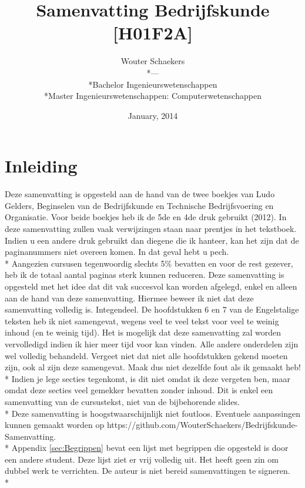 \documentclass[12pt]{article}
\title{Samenvatting Bedrijfskunde [H01F2A]}
\author{Wouter Schaekers\\*---\\*Bachelor Ingenieurswetenschappen\\*Master Ingenieurswetenschappen: Computerwetenschappen}
\date{January, 2014}
\begin{document}
\pagestyle{fancy}
\maketitle
\setcounter{page}{0}
\setcounter{section}{-1}
\renewcommand{\contentsname}{Inhoudstafel}
\setcounter{tocdepth}{3}
\tableofcontents
\clearpage
\section{Inleiding}
Deze samenvatting is opgesteld aan de hand van de twee boekjes van Ludo Gelders, Beginselen van de Bedrijfskunde en Technische Bedrijfsvoering en Organisatie. Voor beide boekjes heb ik de 5de en 4de druk gebruikt (2012). In deze samenvatting zullen vaak verwijzingen staan naar prentjes in het tekstboek. Indien u een andere druk gebruikt dan diegene die ik hanteer, kan het zijn dat de paginanummers niet overeen komen. In dat geval hebt u pech.\\*
Aangezien cursusen tegenwoordig slechts 5\% bevatten en voor de rest gezever, heb ik de totaal aantal paginas sterk kunnen reduceren. Deze samenvatting is opgesteld met het idee dat dit vak succesvol kan worden afgelegd, enkel en alleen aan de hand van deze samenvatting. Hiermee beweer ik niet dat deze samenvatting volledig is. Integendeel. De hoofdstukken 6 en 7 van de Engelstalige teksten heb ik niet samengevat, wegens veel te veel tekst voor veel te weinig inhoud (en te weinig tijd). Het is mogelijk dat deze samenvatting zal worden vervolledigd indien ik hier meer tijd voor kan vinden. Alle andere onderdelen zijn wel volledig behandeld. Vergeet niet dat niet alle hoofdstukken gekend moeten zijn, ook al zijn deze samengevat. Maak dus niet dezelfde fout als ik gemaakt heb!\\*
Indien je lege secties tegenkomt, is dit niet omdat ik deze vergeten ben, maar omdat deze secties veel gemekker bevatten zonder inhoud.
Dit is enkel een samenvatting van de cursustekst, niet van de bijbehorende slides.\\*
Deze samenvatting is hoogstwaarschijnlijk niet foutloos. Eventuele aanpassingen kunnen gemaakt worden op https://github.com/WouterSchaekers/Bedrijfskunde-Samenvatting.\\*
Appendix \ref{sec:Begrippen} bevat een lijst met begrippen die opgesteld is door een andere student. Deze lijst ziet er vrij volledig uit. Het heeft geen zin om dubbel werk te verrichten.
\clearpage
\noindent De auteur is niet bereid samenvattingen te signeren.\\*
\end{document}
